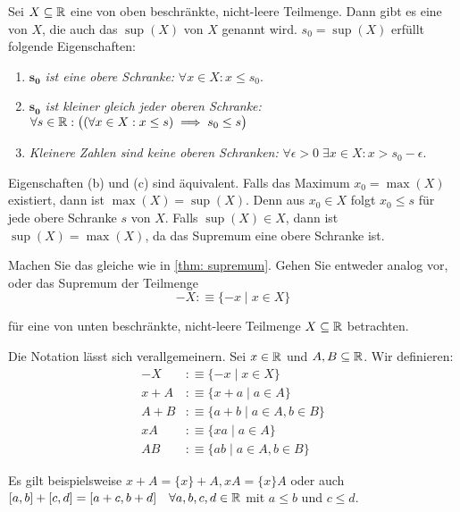 \begin{thm}[Supremum]
  \label{thm: supremum}
  Sei $X \subseteq \mathbb{R}$ eine von oben beschränkte, nicht-leere Teilmenge. Dann gibt es eine  von $X$, die auch das  $\operatorname{sup}(X)$ von $X$ genannt wird. $s_0 = \operatorname{sup}(X)$ erfüllt folgende Eigenschaften:
  \begin{enumerate}
    \item \emph{$\mathbf{s_0}$ ist eine obere Schranke:} $\forall x \in X: x \leq s_0$.
    \item \emph{$\mathbf{s_0}$ ist kleiner gleich jeder oberen Schranke:} $\forall s \in \mathbb{R}: \big((\forall x \in X: x \leq s) \implies s_0 \leq s\big)$
    \item \emph{Kleinere Zahlen sind keine oberen Schranken:} $\forall \epsilon > 0 \; \exists x \in X: x > s_0-\epsilon.$
  \end{enumerate}

  Eigenschaften (b) und (c) sind äquivalent. Falls das Maximum $x_0 = \max(X)$ existiert, dann ist $\max(X) = \sup(X)$. Denn aus $x_0 \in X$ folgt $x_0 \leq s$ für jede obere Schranke $s$ von $X$. Falls $\sup(X) \in X$, dann ist $\sup(X) = \max(X)$, da das Supremum eine obere Schranke ist.
\end{thm}

\begin{ex}
  Machen Sie das gleiche wie in \ref{thm: supremum}. Gehen Sie entweder analog vor, oder das Supremum der  Teilmenge
  \[
    -X :\equiv \{ -x \mid x \in X \}
  \]

  für eine von unten beschränkte, nicht-leere Teilmenge $X \subseteq \mathbb{R}$ betrachten.
\end{ex}

\begin{mydef-non}[Notation]
  Die Notation lässt sich verallgemeinern. Sei $x \in \mathbb{R}$ und $A,B \subseteq \mathbb{R}$. Wir definieren:
  \[
  \begin{aligned}
    -X &:\equiv \{ -x \mid x \in X \} \\
    x+A &:\equiv \{ x+a \mid a \in A \} \\
    A + B &:\equiv \{a + b \mid a \in A, b \in B \} \\
    xA &:\equiv \{xa \mid a \in A \} \\
    AB &:\equiv \{ab \mid a \in A, b \in B \}
  \end{aligned}
  \]

  Es gilt beispielsweise $x+A = \{x\}+A, xA=\{x\}A$ oder auch $[a,b]+[c,d] = [a+c, b+d] \quad \forall a,b,c,d \in \mathbb{R}$ mit $a \leq b$ und $c \leq d$.
\end{mydef-non}

